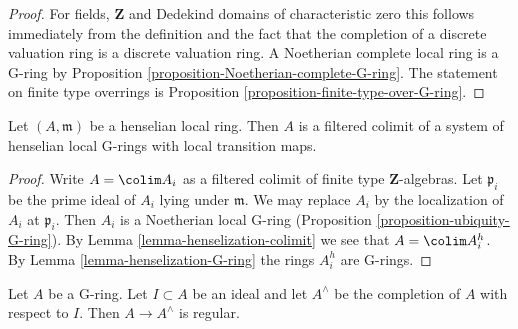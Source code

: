 \begin{proof}
For fields, $\mathbf{Z}$ and Dedekind domains of characteristic zero
this follows immediately from the definition and the fact that the
completion of a discrete valuation ring is a discrete valuation ring.
A Noetherian complete local ring is a G-ring by
Proposition \ref{proposition-Noetherian-complete-G-ring}.
The statement on finite type overrings is
Proposition \ref{proposition-finite-type-over-G-ring}.
\end{proof}

\begin{lemma}
\label{lemma-henselian-local-limit-G-rings}
Let $(A, \mathfrak m)$ be a henselian local ring.
Then $A$ is a filtered colimit of a system
of henselian local G-rings with local
transition maps.
\end{lemma}

\begin{proof}
Write $A = \colim A_i$ as a filtered colimit of finite type
$\mathbf{Z}$-algebras. Let $\mathfrak p_i$ be the prime ideal of
$A_i$ lying under $\mathfrak m$. We may replace $A_i$ by the
localization of $A_i$ at $\mathfrak p_i$. Then $A_i$ is a
Noetherian local G-ring (Proposition \ref{proposition-ubiquity-G-ring}).
By Lemma \ref{lemma-henselization-colimit}
we see that $A = \colim A_i^h$. By
Lemma \ref{lemma-henselization-G-ring}
the rings $A_i^h$ are G-rings.
\end{proof}

\begin{lemma}
\label{lemma-map-G-ring-to-completion-regular}
\begin{reference}
\cite[Theorem 79]{MatCA}
\end{reference}
Let $A$ be a G-ring. Let $I \subset A$ be an ideal
and let $A^\wedge$ be the completion of $A$ with respect to $I$.
Then $A \to A^\wedge$ is regular.
\end{lemma}

